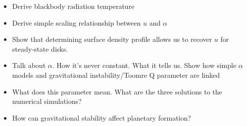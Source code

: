 \documentclass[aps,pra,twocolumn]{revtex4-1}
\begin{document}
\begin{itemize}
  \item Derive blackbody radiation temperature
  \item Derive simple scaling relationship between $u$ and $\alpha$
  \item Show that determining surface density profile allows us to recover $u$ for steady-state disks.
  \item Talk about $\alpha$.  How it's never constant.  What it tells us.  Show how simple $\alpha$ models and gravitational instability/Toomre Q parameter are linked
  \item What does this parameter mean.  What are the three solutions to the numerical simulations?
  \item How can gravitational stability affect planetary formation?
\end{itemize}




\end{document}
